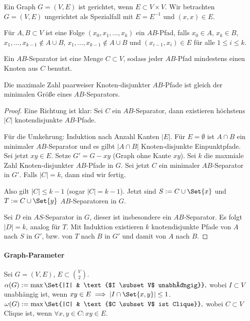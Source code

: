 \begin{df}
    Ein Graph $G = (V, E)$ ist gerichtet, wenn $E \subset V \times V$.
    Wir betrachten $G = (V, E)$ ungerichtet als Spezialfall mit $E = E^{-1}$ und $(x,x) \in E$.

    Für $A, B \subset V$ ist eine Folge $(x_0, x_1, \dotsc, x_k)$ ein $AB$-Pfad, falls $x_0 \in A$, $x_k \in B$,
    $x_1, \dotsc, x_{k-1} \not\in A \cup B$, $x_1, \dotsc, x_{k-1} \not \in A \cup B$ und $(x_{i-1}, x_i) \in E$ für alle $1 \le i \le k$.

    Ein $AB$-Separator ist eine Menge $C \subset V$, sodass jeder $AB$-Pfad mindestens einen Knoten aus $C$ benutzt.
\end{df}

\begin{st}[Menger, 1929]
    Die maximale Zahl paarweiser Knoten-disjunkter $AB$-Pfade ist gleich der minimalen Größe eines $AB$-Separators.
    \begin{proof}
        Eine Richtung ist klar: Sei $C$ ein $AB$-Separator, dann existieren höchstens $|C|$ knotendisjunkte $AB$-Pfade.

        Für die Umkehrung: Induktion nach Anzahl Kanten $|E|$.
        Für $E = \emptyset$ ist $A \cap B$ ein minimaler $AB$-Separator und es gilbt $|A \cap B|$ Knoten-disjunkte Einpunktpfade.
        Sei jetzt $xy \in E$.
        Setze $G' = G - xy$ (Graph ohne Kante $xy$).
        Sei $k$ die maxmiale Zahl Knoten-disjunkter $AB$-Pfade in $G$.
        Sei jetzt $C$ ein minimaler $AB$-Separator in $G'$.
        Falls $|C| = k$, dann sind wir fertig.

        Also gilt $|C| \le k-1$ (sogar $|C| = k-1$).
        Jetzt sind $S := C \cup \Set{x}$ und $T := C \cup \Set{y}$ $AB$-Separatoren in $G$.

        Sei $D$ ein $AS$-Separator in $G$, dieser ist insbesondere ein $AB$-Separator.
        Es folgt $|D| = k$, analog für $T$.
        Mit Induktion existieren $k$ knotendisjunkte Pfade von $A$ nach $S$ in $G'$, bzw. von $T$ nach $B$ in $G'$ und damit von $A$ nach $B$.
    \end{proof}
\end{st}


\paragraph{Graph-Parameter}


Sei $G = (V, E)$, $E \subset \binom{V}{2}$.
\begin{math}
    \alpha(G) := \max\Set{|I| & \text{$I \subset V$ unabhängig}},
\end{math}
wobei $I \subset V$ unabhängig ist, wenn $xy \in E \implies |I \cap \Set{x,y}| \le 1$.
\begin{math}
    \omega(G) := \max\Set{|C| & \text{$C \subset V$ ist Clique}},
\end{math}
wobei $C \subset V$ Clique ist, wenn $\forall x,y \in C : xy \in E$.

